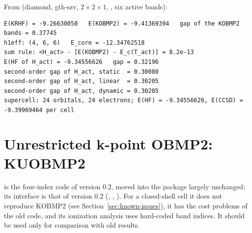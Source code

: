 From  (diamond, gth-szv,
$2\times2\times1$, , six active bands):

\begin{lstlisting}[style=output]
E(KRHF) = -9.26630050   E(KOBMP2) = -9.41369394   gap of the KOBMP2 bands = 0.37745
h1eff: (4, 6, 6)   E_core = -12.34762518
sum rule: <H_act> - [E(KOBMP2) - E_c(T_act)] = 8.2e-13
E(HF of H_act) = -9.34556626   gap = 0.32196
second-order gap of H_act, static  = 0.30080
second-order gap of H_act, linear  = 0.30205
second-order gap of H_act, dynamic = 0.30205
supercell: 24 orbitals, 24 electrons; E(HF) = -9.34556626, E(CCSD) = -9.39969464 per cell
\end{lstlisting}

\section{Unrestricted k-point OBMP2: KUOBMP2}

 is the four-index code of version 0.2, moved into the package
largely unchanged; its interface is that of version 0.2 (,
, ). For a closed-shell cell it does not reproduce
KOBMP2 (see Section~\ref{sec:known-issues}), it has the cost problems of the
old code, and its ionization analysis uses hard-coded band indices. It should
be used only for comparison with old results.
